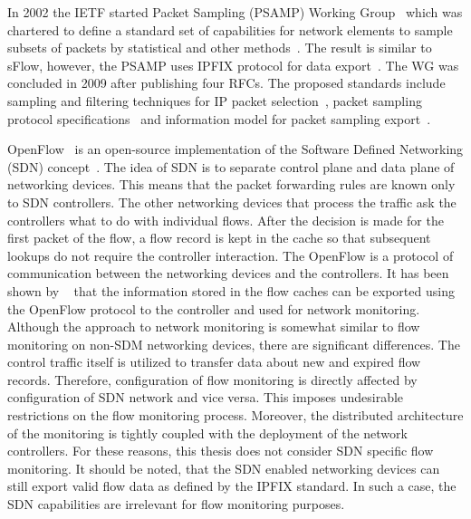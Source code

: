 In 2002 the IETF started Packet Sampling (PSAMP) Working Group~\cite{IETF--Packet} which was chartered to define a standard set of capabilities for network elements to sample subsets of packets by statistical and other methods~\cite{IESG--Packet}. The result is similar to sFlow, however, the PSAMP uses IPFIX protocol for data export~\cite{rfc5477}. The WG was concluded in 2009 after publishing four RFCs. The proposed standards include sampling and filtering techniques for IP packet selection~\cite{rfc5475}, packet sampling protocol specifications~\cite{rfc5476} and information model for packet sampling export~\cite{rfc5477}.

OpenFlow~\cite{ONF-2012-OpenFlow} is an open-source implementation of the Software Defined Networking (SDN) concept~\cite{Singh-2017-Survey, Hu-2014-Survey}. The idea of SDN is to separate control plane and data plane of networking devices. This means that the packet forwarding rules are known only to SDN controllers. The other networking devices that process the traffic ask the controllers what to do with individual flows. After the decision is made for the first packet of the flow, a flow record is kept in the cache so that subsequent lookups do not require the controller interaction. The OpenFlow is a protocol of communication between the networking devices and the controllers. It has been shown by \citeauthor{Yu-2013-FlowSense}~\cite{Yu-2013-FlowSense} that the information stored in the flow caches can be exported using the OpenFlow protocol to the controller and used for network monitoring. Although the approach to network monitoring is somewhat similar to flow monitoring on non-SDM networking devices, there are significant differences. The control traffic itself is utilized to transfer data about new and expired flow records. Therefore, configuration of flow monitoring is directly affected by configuration of SDN network and vice versa. This imposes undesirable restrictions on the flow monitoring process. Moreover, the distributed architecture of the monitoring is tightly coupled with the deployment of the network controllers. For these reasons, this thesis does not consider SDN specific flow monitoring. It should be noted, that the SDN enabled networking devices can still export valid flow data as defined by the IPFIX standard. In such a case, the SDN capabilities are irrelevant for flow monitoring purposes.

